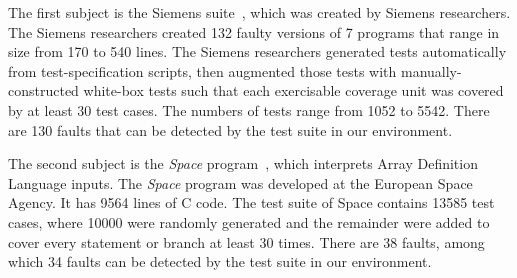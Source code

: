\documentclass{sig-alternate}
\begin{document}
%

The first subject is the Siemens suite~\cite{Hutchins94}, which was
created by Siemens researchers. The Siemens researchers created 132
faulty versions of 7 programs that range in size from 170 to 540
lines. The Siemens researchers generated tests automatically from
test-specification scripts, then augmented those tests with
manually-constructed white-box tests such that each exercisable
coverage unit was covered by at least 30 test cases. The numbers of
tests range from 1052 to 5542. There are 130 faults that can be
detected by the test suite in our environment.

The second subject is the {\it Space} program~\cite{Rothermel01},
which interprets Array Definition Language inputs. The {\it Space}
program was developed at the European Space Agency. It has 9564
lines of C code. The test suite of Space contains 13585 test cases,
where 10000 were randomly generated and the remainder were added to
cover every statement or branch at least 30 times. There are 38
faults, among which 34 faults can be detected by the test suite in
our environment.
\end{document}

